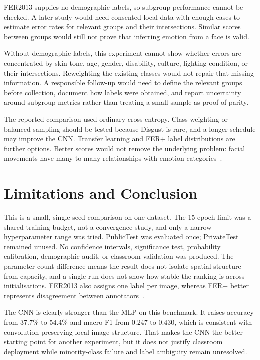 \documentclass[10pt,twocolumn]{article}
\begin{document}
FER2013 supplies no demographic labels, so subgroup performance cannot be checked. A later study would need consented local data with enough cases to estimate error rates for relevant groups and their intersections. Similar scores between groups would still not prove that inferring emotion from a face is valid.

Without demographic labels, this experiment cannot show whether errors are concentrated by skin tone, age, gender, disability, culture, lighting condition, or their intersections. Reweighting the existing classes would not repair that missing information. A responsible follow-up would need to define the relevant groups before collection, document how labels were obtained, and report uncertainty around subgroup metrics rather than treating a small sample as proof of parity.

The reported comparison used ordinary cross-entropy. Class weighting or balanced sampling should be tested because Disgust is rare, and a longer schedule may improve the CNN. Transfer learning and FER+ label distributions are further options. Better scores would not remove the underlying problem: facial movements have many-to-many relationships with emotion categories~\cite{barrett2019}.

\section{Limitations and Conclusion}

This is a small, single-seed comparison on one dataset. The 15-epoch limit was a shared training budget, not a convergence study, and only a narrow hyperparameter range was tried. PublicTest was evaluated once; PrivateTest remained unused. No confidence intervals, significance test, probability calibration, demographic audit, or classroom validation was produced. The parameter-count difference means the result does not isolate spatial structure from capacity, and a single run does not show how stable the ranking is across initialisations. FER2013 also assigns one label per image, whereas FER+ better represents disagreement between annotators~\cite{barsoum2016}.

The CNN is clearly stronger than the MLP on this benchmark. It raises accuracy from 37.7\% to 54.4\% and macro-F1 from 0.247 to 0.430, which is consistent with convolution preserving local image structure. That makes the CNN the better starting point for another experiment, but it does not justify classroom deployment while minority-class failure and label ambiguity remain unresolved.

\begingroup


\endgroup
\end{document}
